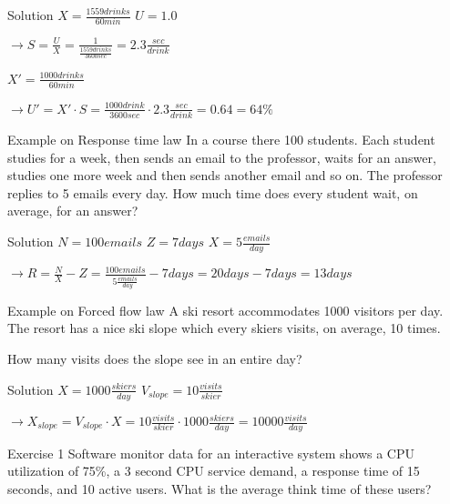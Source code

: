 \documentclass[]{beamer}
\begin{document}
\begin{frame}{Solution}
$X = \frac{1559 drinks}{60 min}$ \hspace{.5cm}
$U = 1.0$

$\rightarrow S = \frac{U}{X} = \frac{1}{\frac{1559 drinks}{3600 sec}} = 2.3 \frac{sec}{drink}$

$X' = \frac{1000 drinks}{60 min}$

$\rightarrow U' = X' \cdot S = \frac{1000 drink}{3600 sec} \cdot 2.3 \frac{sec}{drink} = 0.64 = 64\%$
\end{frame}

\begin{frame}{Example on Response time law}
In a course there 100 students. Each student studies for a week, then sends an email to the professor, waits for an answer, studies one more week and then sends another email and so on. The professor replies to 5 emails every day. How much time does every student wait, on average, for an answer?
\end{frame}

\begin{frame}{Solution}
$N = 100 emails$ \hspace{.5cm}
$Z = 7 days$ \hspace{.5cm}
$X = 5 \frac{emails}{day}$

$\rightarrow R = \frac{N}{X} - Z = \frac{100 emails}{5 \frac{emails}{day}} - 7 days = 20 days - 7 days = 13 days$
\end{frame}

\begin{frame}{Example on Forced flow law}
A ski resort accommodates 1000 visitors per day. The resort has a nice ski slope which every skiers visits, on average, 10 times.

How many visits does the slope see in an entire day?
\end{frame}

\begin{frame}{Solution}
$X = 1000 \frac{skiers}{day}$\hspace{.5cm}
$V_{slope} = 10\frac{visits}{skier}$

$\rightarrow X_{slope} = V_{slope}\cdot X = 10\frac{visits}{skier} \cdot 1000 \frac{skiers}{day} = 10000 \frac{visits}{day}$ 
\end{frame}

\begin{frame}{Exercise 1 \cite{lazowska1984quantitative}}
Software monitor data for an interactive system shows a CPU utilization of 75\%, a 3 second CPU service demand, a response time of 15 seconds, and 10 active users. What is the average think time of these users?
\end{frame}
\end{document}
